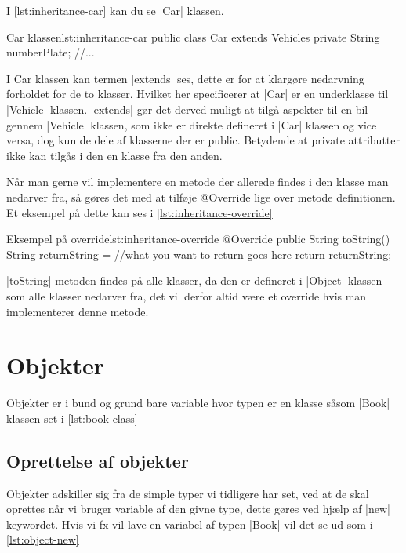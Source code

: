 I \autoref{lst:inheritance-car} kan du se \JavaInline|Car| klassen.

\begin{JavaCode}{Car klassen}{lst:inheritance-car}
	public class Car extends Vehicles
	{
		private String numberPlate;
		//...
	}
\end{JavaCode}

I Car klassen kan termen \JavaInline|extends| ses, dette er for at klargøre nedarvning forholdet for de to klasser. Hvilket her specificerer at \JavaInline|Car| er en underklasse til \JavaInline|Vehicle| klassen. \JavaInline|extends| gør det derved muligt at tilgå aspekter til en bil gennem \JavaInline|Vehicle| klassen, som ikke er direkte defineret i \JavaInline|Car| klassen og vice versa, dog kun de dele af klasserne der er public. Betydende at private attributter ikke kan tilgås i den en klasse fra den anden.

Når man gerne vil implementere en metode der allerede findes i den klasse man nedarver fra, så gøres det med at tilføje @Override lige over metode definitionen. Et eksempel på dette kan ses i \autoref{lst:inheritance-override}

\begin{JavaCode}{Eksempel på override}{lst:inheritance-override}
	@Override
	public String toString() {
		String returnString = //what you want to return goes here
		return returnString;
	}
\end{JavaCode}

\JavaInline|toString| metoden findes på alle klasser, da den er defineret i \JavaInline|Object| klassen som alle klasser nedarver fra, det vil derfor altid være et override hvis man implementerer denne metode.






\section{Objekter}

Objekter er i bund og grund bare variable hvor typen er en klasse
såsom \JavaInline|Book| klassen set i \autoref{lst:book-class}

\subsection{Oprettelse af objekter}

Objekter adskiller sig fra de simple typer vi tidligere har set, ved
at de skal oprettes når vi bruger variable af den givne type, dette
gøres ved hjælp af \JavaInline|new| keywordet. Hvis vi fx vil lave en
variabel af typen \JavaInline|Book| vil det se ud som i
\autoref{lst:object-new}

